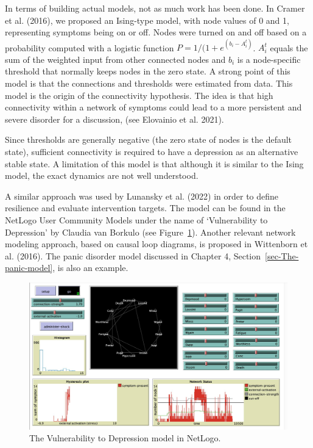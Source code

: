 \documentclass[
  a4paper,
  DIV=11,
  numbers=noendperiod,
  oneside]{scrreprt}
\begin{document}
In terms of building actual models, not as much work has been done. In
Cramer et al. (2016), we proposed an Ising-type model, with node values
of 0 and 1, representing symptoms being on or off. Nodes were turned on
and off based on a probability computed with a logistic function
\(P = 1/(1 + e^{(b_{i} - A_{i}^{t})}\). \(A_{i}^{t}\) equals the sum of
the weighted input from other connected nodes and \(b_{i}\) is a
node-specific threshold that normally keeps nodes in the zero state. A
strong point of this model is that the connections and thresholds were
estimated from data. This model is the origin of the connectivity
hypothesis. The idea is that high connectivity within a network of
symptoms could lead to a more persistent and severe disorder for a
discussion, (see Elovainio et al. 2021).

Since thresholds are generally negative (the zero state of nodes is the
default state), sufficient connectivity is required to have a depression
as an alternative stable state. A limitation of this model is that
although it is similar to the Ising model, the exact dynamics are not
well understood.

A similar approach was used by Lunansky et al. (2022) in order to define
resilience and evaluate intervention targets. The model can be found in
the NetLogo User Community Models under the name of `Vulnerability to
Depression' by Claudia van Borkulo (see
Figure~\ref{fig-ch6-img9-old-78}). Another relevant network modeling
approach, based on causal loop diagrams, is proposed in Wittenborn et
al. (2016). The panic disorder model discussed in Chapter 4,
Section~\ref{sec-The-panic-model}, is also an example.

\begin{figure}

{\centering \includegraphics{media/ch6/image9.jpg}

}

\caption{\label{fig-ch6-img9-old-78}The Vulnerability to Depression
model in NetLogo.}

\end{figure}
\end{document}
